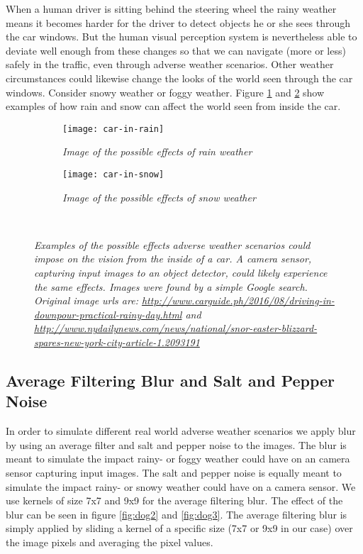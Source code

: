 \documentclass{article}
\begin{document}
When a human driver is sitting behind the steering wheel the rainy weather means it becomes harder for the driver to detect objects he or she sees through the car windows. But the human visual perception system is nevertheless able to deviate well enough from these changes so that we can navigate (more or less) safely in the traffic, even through adverse weather scenarios. Other weather circumstances could likewise change the looks of the world seen through the car windows. Consider snowy weather or foggy weather. Figure \ref{fig:car-in-rain} and \ref{fig:car-in-snow} show examples of how rain and snow can affect the world seen from inside the car. 

\begin{figure}[h]
\begin{subfigure}{.5\linewidth}
\captionsetup{width=.9\linewidth}
\centering
\texttt{[image: car-in-rain]}
\caption{\textit{Image of the possible effects of rain weather}}
\label{fig:car-in-rain}
\end{subfigure}%
\begin{subfigure}{.5\linewidth}
\captionsetup{width=.9\linewidth}
\centering
\texttt{[image: car-in-snow]}
\caption{\textit{Image of the possible effects of snow weather}}
\label{fig:car-in-snow}
\end{subfigure}\\[1ex]
\caption{\textit{Examples of the possible effects adverse weather scenarios could impose on the vision from the inside of a car. A camera sensor, capturing input images to an object detector, could likely experience the same effects. Images were found by a simple Google search. Original image urls are: \url{http://www.carguide.ph/2016/08/driving-in-downpour-practical-rainy-day.html} and \url{http://www.nydailynews.com/news/national/snor-easter-blizzard-spares-new-york-city-article-1.2093191}}}
\label{fig:car-in-weathers}
\end{figure}

\subsection{Average Filtering Blur and Salt and Pepper Noise}
\label{sec:noise-patterns}
In order to simulate different real world adverse weather scenarios we apply blur by using an average filter and salt and pepper noise to the images. The blur is meant to simulate the impact rainy- or foggy weather could have on an camera sensor capturing input images. The salt and pepper noise is equally meant to simulate the impact rainy- or snowy weather could have on a camera sensor. We use kernels of size 7x7 and 9x9 for the average filtering blur. The effect of the blur can be seen in figure \ref{fig:dog2} and \ref{fig:dog3}. The average filtering blur is simply applied by sliding a kernel of a specific size (7x7 or 9x9 in our case) over the image pixels and averaging the pixel values.
\end{document}
